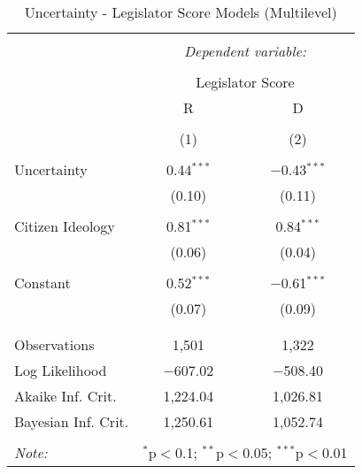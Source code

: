 
\begin{table}[!htbp] \centering 
  \caption{Uncertainty - Legislator Score Models (Multilevel)} 
  \label{div.unc.mlm.models} 
\begin{tabular}{@{\extracolsep{5pt}}lcc} 
\\[-1.8ex]\hline 
\hline \\[-1.8ex] 
 & \multicolumn{2}{c}{\textit{Dependent variable:}} \\ 
\cline{2-3} 
\\[-1.8ex] & \multicolumn{2}{c}{Legislator Score} \\ 
 & R & D \\ 
\\[-1.8ex] & (1) & (2)\\ 
\hline \\[-1.8ex] 
 Uncertainty & 0.44$^{***}$ & $-$0.43$^{***}$ \\ 
  & (0.10) & (0.11) \\ 
  & & \\ 
 Citizen Ideology & 0.81$^{***}$ & 0.84$^{***}$ \\ 
  & (0.06) & (0.04) \\ 
  & & \\ 
 Constant & 0.52$^{***}$ & $-$0.61$^{***}$ \\ 
  & (0.07) & (0.09) \\ 
  & & \\ 
\hline \\[-1.8ex] 
Observations & 1,501 & 1,322 \\ 
Log Likelihood & $-$607.02 & $-$508.40 \\ 
Akaike Inf. Crit. & 1,224.04 & 1,026.81 \\ 
Bayesian Inf. Crit. & 1,250.61 & 1,052.74 \\ 
\hline 
\hline \\[-1.8ex] 
\textit{Note:}  & \multicolumn{2}{r}{$^{*}$p$<$0.1; $^{**}$p$<$0.05; $^{***}$p$<$0.01} \\ 
\end{tabular} 
\end{table} 
